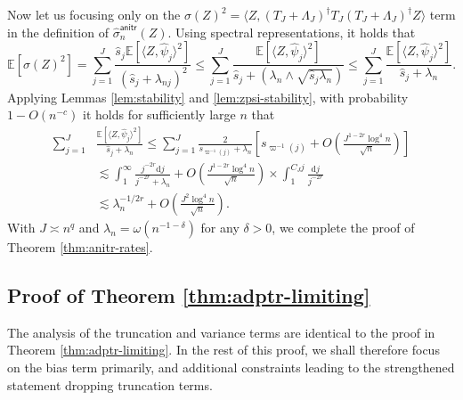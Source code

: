 \documentclass[11pt,a4paper]{article}
\renewcommand{\hat}{\widehat}
\theoremstyle{definition}
\theoremstyle{plain}
\theoremstyle{remark}
\newcommand{\ud}{\mathrm d}
\newcommand{\anitr}{\mathsf{anitr}}
\begin{document}
Now let us focusing only on the $\sigma(Z)^2=\langle Z,(T_J+\Lambda_J)^\dagger T_J (T_J+\Lambda_J)^\dagger Z\rangle$ term in the definition of $\hat\sigma_n^\anitr(Z)$.
Using spectral representations, it holds that
\begin{equation}
\mathbb E[\sigma(Z)^2] = \sum_{j=1}^J \frac{\hat s_j \mathbb E[\langle Z,\hat\psi_j\rangle^2]}{(\hat s_j+\lambda_{nj})^2}\leq 
\sum_{j=1}^J\frac{\mathbb E[\langle Z,\hat\psi_j\rangle^2]}{{\hat s_j}+(\lambda_n\wedge\sqrt{\hat s_j\lambda_n})}
\leq \sum_{j=1}^J\frac{\mathbb E[\langle Z,\hat\psi_j\rangle^2]}{{\hat s_j}+\lambda_n}.
\label{eq:proof-anitr-rates-1}
\end{equation}
Applying Lemmas \ref{lem:stability} and \ref{lem:zpsi-stability}, with probability $1-O(n^{-c})$ it holds for sufficiently large $n$ that
\begin{align}
\sum_{j=1}^J&\frac{\mathbb E[\langle Z,\hat\psi_j\rangle^2]}{{\hat s_j}+{\lambda_n}}
\leq \sum_{j=1}^J\frac{2}{{s_{\varpi^{-1}(j)}}+\lambda_n}\left[s_{\varpi^{-1}(j)} + O\left(\frac{J^{1-2r}\log^4 n}{\sqrt{n}}\right)\right]\nonumber\\
&\lesssim \int_1^{\infty} \frac{j^{-2r}\ud j}{j^{-2r}+{\lambda_n}} + O\left(\frac{J^{1-2r}\log^4 n}{\sqrt{n}}\right)\times \int_1^{C_J j}\frac{\ud j}{j^{-2r}}\nonumber\\
&\lesssim \lambda_n^{-1/2r} + O\left(\frac{J^2\log^4 n}{\sqrt{n}}\right).
\end{align}
With $J\asymp n^q$ and $\lambda_n=\omega(n^{-1-\delta})$ for any $\delta>0$, we complete the proof of Theorem \ref{thm:anitr-rates}.


\subsection{Proof of Theorem \ref{thm:adptr-limiting}}

The analysis of the truncation and variance terms are identical to the proof in Theorem \ref{thm:adptr-limiting}.
In the rest of this proof, we shall therefore focus on the bias term primarily, and additional constraints leading to the strengthened statement dropping truncation terms.
\end{document}

